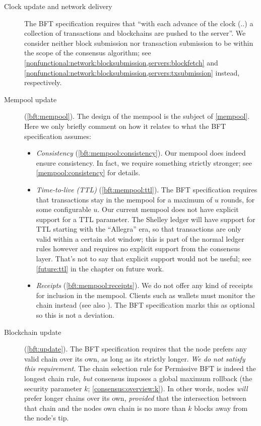 \begin{description}
  \item[Clock update and network delivery] The BFT specification requires that
  ``with each advance of the clock (..) a collection of transactions and
  blockchains are pushed to the server''. We consider neither block submission
  nor transaction submission to be within the scope of the consensus algorithm;
  see \cref{nonfunctional:network:blocksubmission,servers:blockfetch} and
  \cref{nonfunctional:network:blocksubmission,servers:txsubmission} instead, respectively.

  \item[Mempool update] (\cref{bft:mempool}). The design of the mempool is the
  subject of \cref{mempool}. Here we only briefly comment on how it relates to
  what the BFT specification assumes:
%
  \begin{itemize}
    \item \textit{Consistency} (\cref{bft:mempool:consistency}). Our mempool
    does indeed ensure consistency. In fact, we require something strictly
    stronger; see \cref{mempool:consistency} for details.
    \item \textit{Time-to-live (TTL)} (\cref{bft:mempool:ttl}). The BFT
    specification requires that transactions stay in the mempool for a maximum
    of $u$ rounds, for some configurable $u$. Our current mempool does not have
    explicit support for a TTL parameter. The Shelley ledger will have support
    for TTL starting with the ``Allegra'' era, so that transactions are only
    valid within a certain slot window; this is part of the normal ledger rules
    however and requires no explicit support from the consensus layer. That's
    not to say that explicit support would not be useful; see \cref{future:ttl}
    in the chapter on future work.
    \item \textit{Receipts} (\cref{bft:mempool:receipts}). We do not offer any
    kind of receipts for inclusion in the mempool. Clients such as wallets must
    monitor the chain instead (see also \cite{wallet-spec}). The BFT
    specification marks this as optional so this is not a deviation.
  \end{itemize}
%
  \item[Blockchain update] (\cref{bft:update}). The BFT specification requires
  that the node prefers any valid chain over its own, as long as its strictly
  longer. \emph{We do not satisfy this requirement.} The chain selection rule
  for Permissive BFT is indeed the longest chain rule, \emph{but} consensus
  imposes a global maximum rollback (the security parameter $k$;
  \cref{consensus:overview:k}). In other words, nodes \emph{will} prefer longer
  chains over its own, \emph{provided} that the intersection between that chain
  and the nodes own chain is no more than $k$ blocks away from the node's tip.


\end{description}
